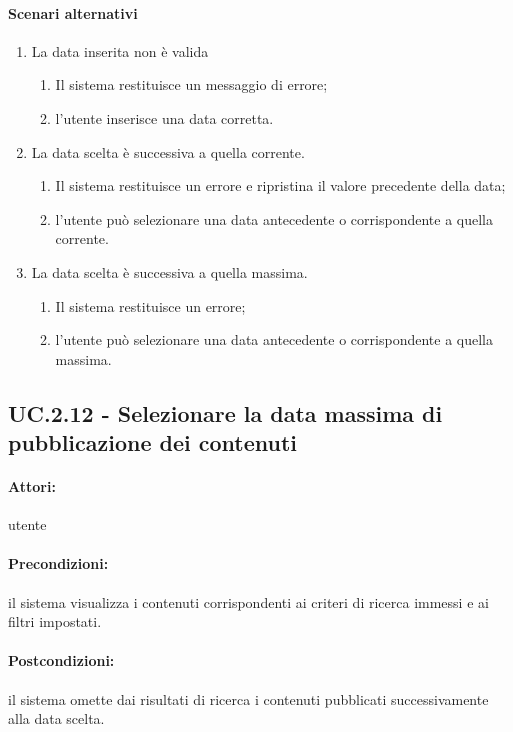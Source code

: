 \documentclass[10pt,a4paper,headinclude,footinclude,hidelinks]{scrreprt} %
\begin{document}
	\paragraph{Scenari alternativi}
	\begin{enumerate}
	\item La data inserita non è valida
		\begin{enumerate}
		\item Il sistema restituisce un messaggio di errore;
		\item l'utente inserisce una data corretta.
		\end{enumerate}
	\item La data scelta è successiva a quella corrente.
		\begin{enumerate}
		\item Il sistema restituisce un errore e ripristina il valore precedente della data;
		\item l'utente può selezionare una data antecedente o corrispondente a quella corrente.
		\end{enumerate}
	\item La data scelta è successiva a quella massima.
		\begin{enumerate}
		\item Il sistema restituisce un errore;
		\item l'utente può selezionare una data antecedente o corrispondente a quella massima.
		\end{enumerate}
	\end{enumerate}

	\subsection[UC.2.12]{UC.2.12 - Selezionare la data massima di pubblicazione dei contenuti}
	\label{sec:stage:ar:uc:2_12}
	\paragraph{Attori:} utente
	\paragraph{Precondizioni:} il sistema visualizza i contenuti corrispondenti ai criteri di ricerca immessi e ai filtri impostati.
	\paragraph{Postcondizioni:} il sistema omette dai risultati di ricerca i contenuti pubblicati successivamente alla data scelta.
\end{document}
